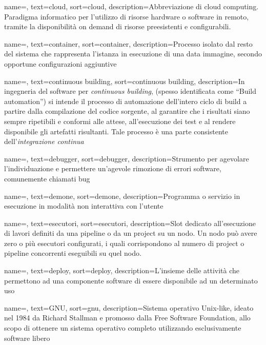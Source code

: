 {
    name=,
    text=cloud,
    sort=cloud,
    description={Abbreviazione di cloud computing. Paradigma informatico per l'utilizzo di risorse hardware o software in remoto, tramite la disponibilità on demand di risorse preesistenti e configurabili.}
}

{
    name=,
    text=container,
    sort=container,
    description={Processo isolato dal resto del sistema che rappresenta l'istanza in esecuzione di una data immagine, secondo opportune configurazioni aggiuntive}
}

{
    name=,
    text=continuous building,
    sort=continuous building,
    description={In ingegneria del software per \emph{continuous building}, (spesso identificata come ``Build automation'') si intende il processo di automazione dell'intero ciclo di build a partire dalla compilazione del codice sorgente, al garantire che i risultati siano sempre ripetibili e conformi alle attese, all'esecuzione dei test e al rendere disponibile gli artefatti risultanti. Tale processo è una parte consistente dell'\textit{integrazione continua}}
}

{
    name=,
    text=debugger,
    sort=debugger,
    description={Strumento per agevolare l'individuazione e permettere un'agevole rimozione di errori software, comunemente chiamati bug}
}

{
    name=,
    text=demone,
    sort=demone,
    description={Programma o servizio in esecuzione in modalità non interattiva con l'utente}
}

{
    name=,
    text=esecutori,
    sort=esecutori,
    description={Slot dedicato all'esecuzione di lavori definiti da una pipeline o da un project su un nodo. Un nodo può avere zero o più esecutori configurati, i quali corrispondono al numero di project o pipeline concorrenti eseguibili su quel nodo.}
}

{
    name=,
    text=deploy,
    sort=deploy,
    description={L'insieme delle attività che permettono ad una componente software di essere disponibile ad un determinato uso}
}

{
    name=,
    text=GNU,
    sort=gnu,
    description={Sistema operativo Unix-like, ideato nel 1984 da Richard Stallman e promosso dalla Free Software Foundation, allo scopo di ottenere un sistema operativo completo utilizzando esclusivamente software libero}
}

